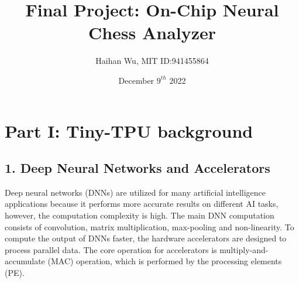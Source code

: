 \documentclass[12pt]{article}
\begin{document}


\title{\fontsize{25}{15}\selectfont Final Project: On-Chip Neural Chess Analyzer}
\author{Haihan Wu, MIT ID:941455864}
\date{December \(9^{th}\) 2022}
\maketitle

\section*{Part I: Tiny-TPU background}
\subsection*{1. Deep Neural Networks and Accelerators}
Deep neural networks (DNNs) are utilized for many artificial intelligence applications because it performs more accurate results on different AI tasks, however, the computation complexity is high. The main DNN computation consists of convolution, matrix multiplication, max-pooling and non-linearity. To compute the output of DNNs faster, the hardware accelerators are designed to process parallel data.
The core operation for accelerators is multiply-and-accumulate (MAC) operation, which is performed by the processing elements (PE). 
\end{document}
